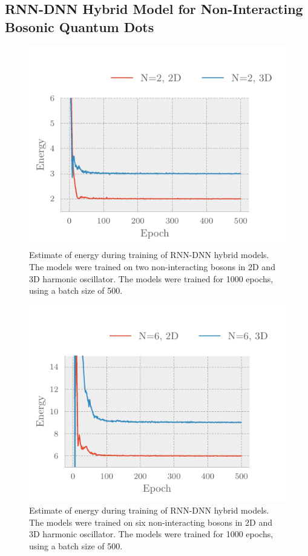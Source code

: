 \subsection{RNN-DNN Hybrid Model for Non-Interacting Bosonic Quantum Dots}
\begin{figure}[H]
	\includegraphics[]{figures/many_part_nonint_training1.pdf}
	\caption{Estimate of energy during training of RNN-DNN hybrid models. The models were trained on two non-interacting bosons in 2D and 3D harmonic oscillator. The models were trained for 1000 epochs, using a batch size of 500.}
	\label{fig:many_part_nonint_training1}
\end{figure}

\begin{figure}[H]
	\includegraphics[]{figures/many_part_nonint_training2.pdf}
	\caption{Estimate of energy during training of RNN-DNN hybrid models. The models were trained on six non-interacting bosons in 2D and 3D harmonic oscillator. The models were trained for 1000 epochs, using a batch size of 500.}
	\label{fig:many_part_nonint_training2}
\end{figure}

